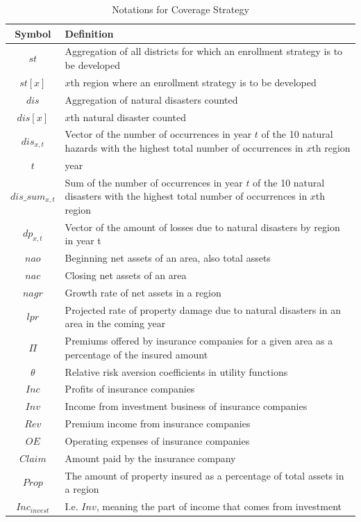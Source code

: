 \documentclass[12pt]{article}  %
\begin{document}
\begin{longtable}{ c p{28em} }
\caption{Notations for Coverage Strategy}
\label{tb:longtable}\\
\toprule
\multicolumn{1}{m{3cm}}{\centering Symbol}
	&\multicolumn{1}{m{11cm}}{\centering Definition}\\
\midrule
$st$ & Aggregation of all districts for which an enrollment strategy is to be developed \\
$st[x]$ & $x$th region where an enrollment strategy is to be developed \\
$dis$ & Aggregation of natural disasters counted \\
$dis[x]$ & $x$th natural disaster counted \\
$dis_{x,t}$ & Vector of the number of occurrences in year $t$ of the 10 natural hazards with the highest total number of occurrences in $x$th region \\
$t$ & year \\
$dis\_sum_{x,t}$ & Sum of the number of occurrences in year $t$ of the 10 natural disasters with the highest total number of occurrences in $x$th region \\
$dp_{x,t}$ & Vector of the amount of losses due to natural disasters by region in year t \\
$nao$ & Beginning net assets of an area, also total assets \\
$nac$ & Closing net assets of an area \\
$nagr$ & Growth rate of net assets in a region \\
$lpr$ & Projected rate of property damage due to natural disasters in an area in the coming year \\
$\Pi$ & Premiums offered by insurance companies for a given area as a percentage of the insured amount \\
$\theta$ & Relative risk aversion coefficients in utility functions \\
$Inc$ & Profits of insurance companies \\
$Inv$ & Income from investment business of insurance companies \\
$Rev$ & Premium income from insurance companies \\
$OE$ & Operating expenses of insurance companies \\
$Claim$ & Amount paid by the insurance company \\
$Prop$ & The amount of property insured as a percentage of total assets in a region \\
$Inc_{invest}$ & I.e. $Inv$, meaning the part of income that comes from investment \\
\bottomrule
\end{longtable}
\end{document}
